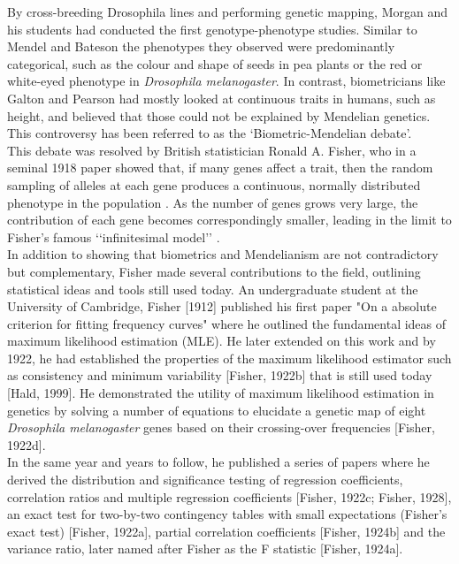 By cross-breeding Drosophila lines and performing genetic mapping, Morgan and his students had conducted the first genotype-phenotype studies. 
Similar to Mendel and Bateson the phenotypes they observed were predominantly categorical, such as the colour and shape of seeds in pea plants or the red or white-eyed phenotype in \textit{Drosophila melanogaster}. 
In contrast, biometricians like Galton and Pearson had mostly looked at continuous traits in humans, such as height, and believed that those could not be explained by Mendelian genetics.
This controversy has been referred to as the ‘Biometric-Mendelian debate’.\\ 

This debate was resolved by British statistician Ronald A. Fisher, who in a seminal 1918 paper showed that, if many genes affect a trait, then the random sampling of alleles at each gene produces a continuous, normally distributed phenotype in the population \cite{fisher1919xv}. 
As the number of genes grows very large, the contribution of each gene becomes correspondingly smaller, leading in the limit to Fisher’s famous ‘‘infinitesimal model’’ \cite{barton2017infinitesimal}.\\

In addition to showing that biometrics and Mendelianism are not contradictory but complementary, Fisher made several contributions to the field, outlining statistical ideas and tools still used today. 
An undergraduate student at the University of Cambridge, Fisher [1912] published his first paper "On a absolute criterion for fitting frequency curves" where he outlined the fundamental ideas of maximum likelihood estimation (MLE). 
He later extended on this work and by 1922, he had established the properties of the maximum likelihood estimator such as consistency and minimum variability [Fisher, 1922b] that is still used today [Hald, 1999]. 
He demonstrated the utility of maximum likelihood estimation in genetics by solving a number of equations to elucidate a genetic map of eight \textit{Drosophila melanogaster} genes based on their crossing-over frequencies [Fisher, 1922d].\\ 

In the same year and years to follow, he published a series of papers where he derived the distribution and significance testing of regression coefficients, correlation ratios and multiple regression coefficients [Fisher, 1922c; Fisher, 1928], an exact test for two-by-two contingency tables with small expectations (Fisher’s exact test) [Fisher, 1922a], partial correlation coefficients [Fisher, 1924b] and the variance ratio, later named after Fisher as the F statistic [Fisher, 1924a]. 

